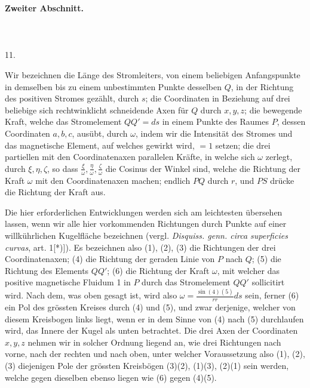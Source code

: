 \clearpage\begingroup
{}
\begin{center}
\textbf{Zweiter Abschnitt.}\\[8pt]
\\
\\
\\[10pt]
11.
\end{center}
\noindent\hspace*{\parindent}Wir bezeichnen die Länge des Stromleiters, von einem beliebigen Anfangspunkte in demselben bis zu einem unbestimmten Punkte desselben $Q$, in der Richtung des positiven Stromes gezählt, durch $s$; die Coordinaten in Beziehung auf drei beliebige sich rechtwinklicht schneidende Axen für $Q$ durch $x,y,z$; die bewegende Kraft, welche das Stromelement $QQ'=ds$ in einem Punkte des Raumes $P$, dessen Coordinaten $a,b,c$, ausübt, durch $\omega$, indem wir die Intensität des Stromes und das magnetische Element, auf welches gewirkt wird, $=1$ setzen; die drei partiellen mit den Coordinatenaxen parallelen Kräfte, in welche sich $\omega$ zerlegt, durch $\xi,\eta,\zeta$, so dass $\frac{\xi}{\omega},\frac{\eta}{\omega},\frac{\zeta}{\omega}$ die Cosinus der Winkel sind, welche die Richtung der Kraft $\omega$ mit den Coordinatenaxen machen; endlich $PQ$ durch $r$, und $PS$ drücke die Richtung der Kraft aus.

Die hier erforderlichen Entwicklungen werden sich am leichtesten übersehen lassen, wenn wir alle hier vorkommenden Richtungen durch Punkte auf einer willkührlichen Kugelfläche bezeichnen (vergl. \textit{Disquiss. genn. circa superficies curvas}, art. 1[*)]\begingroup\renewcommand{\thefootnote}{}\footnotetext{[*) Werke IV, S. 219.]}\endgroup). Es bezeichnen also (1), (2), (3) die Richtungen der drei Coordinatenaxen; (4) die Richtung der geraden Linie von $P$ nach $Q$; (5) die Richtung des Elements $QQ'$; (6) die Richtung der Kraft $\omega$, mit welcher das positive magnetische Fluidum 1 in $P$ durch das Stromelement $QQ'$ sollicitirt wird.
\clearpage{}
\noindent\hspace*{\parindent}Nach dem, was oben gesagt ist, wird also $\omega=\frac{\sin(4)(5)}{rr}ds$ sein, ferner (6) ein Pol des grössten Kreises durch (4) und (5), und zwar derjenige, welcher von diesem Kreisbogen links liegt, wenn er in dem Sinne von (4) nach (5) durchlaufen wird, das Innere der Kugel als unten betrachtet. Die drei Axen der Coordinaten $x,y,z$ nehmen wir in solcher Ordnung liegend an, wie drei Richtungen nach vorne, nach der rechten und nach oben, unter welcher Voraussetzung also (1), (2), (3) diejenigen Pole der grössten Kreisbögen (3)(2), (1)(3), (2)(1) sein werden, welche gegen dieselben ebenso liegen wie (6) gegen (4)(5).

